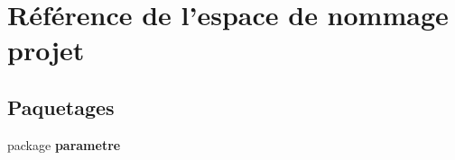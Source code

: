 \section{\-Référence de l'espace de nommage projet}
\label{namespaceprojet}
\subsection*{\-Paquetages}
\begin{DoxyCompactItemize}
\item 
package {\bf parametre}
\end{DoxyCompactItemize}

